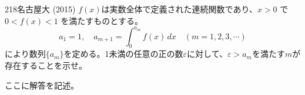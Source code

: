 \begin{thm}{218}{}{名古屋大 (2015)}
 $f(x)$は実数全体で定義された連続関数であり、$x>0$ で $0<f(x)<1$ を満たすものとする。
 \[ a_1=1,\quad a_{m+1}=\int_0^{a_m}\! f(x) \,dx \quad (m=1, 2, 3, \cdots) \]
 により数列$\{a_m\}$を定める。1未満の任意の正の数$\varepsilon$に対して、$\varepsilon>a_m$を満たす$m$が存在することを示せ。
\end{thm}

ここに解答を記述。